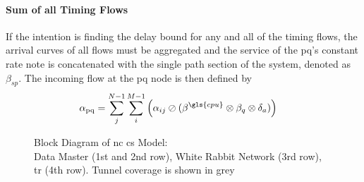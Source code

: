 \paragraph{Sum of all Timing Flows}
If the intention is finding the delay bound for any and all of the timing flows, the arrival curves of all flows must be aggregated and the service
of the \gls{pq}'s constant rate note is concatenated with the single path section of the system, denoted as $\beta_{sp}$. The incoming flow at the \gls{pq} node
is then defined by
\begin{equation}
\begin{aligned}
\mathrm{\alpha_{pq}} &=  \sum_j^{N-1} \sum_i^{M-1} \left( \alpha_{ij} \oslash (\beta^{\gls{cpu}} \otimes \beta_q \otimes \delta_a) \right)
\label{eq:foi_sum}
\end{aligned}
\end{equation}
%
\begin{figure}[H]
  \centering
  \def\svgwidth{0.95\textheight}
  \caption{Block Diagram of \gls{nc}  \gls{cs} Model:\\Data Master (1st and 2nd row), White Rabbit Network (3rd row),\\\gls{tr} (4th row). Tunnel coverage is shown in grey}
  \label{fig:all_block}
\end{figure}



